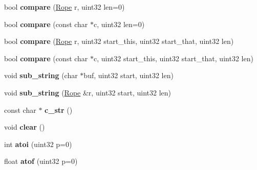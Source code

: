 \begin{DoxyCompactItemize}
\item 
\hypertarget{classetk_1_1_rope_a9996dd7fc5da3b0d4a70c6ee7b678923}{bool {\bfseries compare} (\hyperlink{classetk_1_1_rope}{Rope} r, uint32 len=0)}\label{classetk_1_1_rope_a9996dd7fc5da3b0d4a70c6ee7b678923}

\item 
\hypertarget{classetk_1_1_rope_a0c7d6cf95d31f44d4498b66fc070fa0a}{bool {\bfseries compare} (const char $\ast$c, uint32 len=0)}\label{classetk_1_1_rope_a0c7d6cf95d31f44d4498b66fc070fa0a}

\item 
\hypertarget{classetk_1_1_rope_adcbd85328a25f4d90721127bd32383c0}{bool {\bfseries compare} (\hyperlink{classetk_1_1_rope}{Rope} r, uint32 start\-\_\-this, uint32 start\-\_\-that, uint32 len)}\label{classetk_1_1_rope_adcbd85328a25f4d90721127bd32383c0}

\item 
\hypertarget{classetk_1_1_rope_a272f8f5e2e5110463baecbf77518a2de}{bool {\bfseries compare} (const char $\ast$c, uint32 start\-\_\-this, uint32 start\-\_\-that, uint32 len)}\label{classetk_1_1_rope_a272f8f5e2e5110463baecbf77518a2de}

\item 
\hypertarget{classetk_1_1_rope_a223a182d7113573cfb3e21768c82a556}{void {\bfseries sub\-\_\-string} (char $\ast$buf, uint32 start, uint32 len)}\label{classetk_1_1_rope_a223a182d7113573cfb3e21768c82a556}

\item 
\hypertarget{classetk_1_1_rope_a8d6946ae50ae3593b54f48b0d35c52ee}{void {\bfseries sub\-\_\-string} (\hyperlink{classetk_1_1_rope}{Rope} \&r, uint32 start, uint32 len)}\label{classetk_1_1_rope_a8d6946ae50ae3593b54f48b0d35c52ee}

\item 
\hypertarget{classetk_1_1_rope_a8482418c97840cf01858cc6ca18089a9}{const char $\ast$ {\bfseries c\-\_\-str} ()}\label{classetk_1_1_rope_a8482418c97840cf01858cc6ca18089a9}

\item 
\hypertarget{classetk_1_1_rope_acd34769b990ad387b86072e441972399}{void {\bfseries clear} ()}\label{classetk_1_1_rope_acd34769b990ad387b86072e441972399}

\item 
\hypertarget{classetk_1_1_rope_a8f3c8650f341401cecf83e103253837d}{int {\bfseries atoi} (uint32 p=0)}\label{classetk_1_1_rope_a8f3c8650f341401cecf83e103253837d}

\item 
\hypertarget{classetk_1_1_rope_aa934a47acae6915d4385f8f6bd823497}{float {\bfseries atof} (uint32 p=0)}\label{classetk_1_1_rope_aa934a47acae6915d4385f8f6bd823497}


\end{DoxyCompactItemize}
